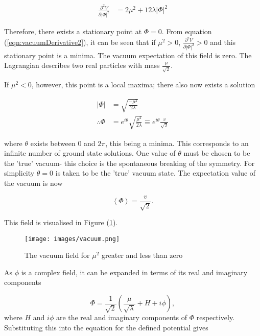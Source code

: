 \documentclass{article}
\begin{document}
\begin{equation}
\label{eqn:vacuumDerivative2}
\begin{split}
\frac{\partial^2 V}{\partial |\Phi|^2} & = 2\mu^2 + 12\lambda|\Phi|^2
\end{split}
\end{equation}

Therefore, there exists a stationary point at $\Phi = 0$. From equation (\ref{eqn:vacuumDerivative2}), it can be seen that if $\mu^2>0$, $\frac{\partial^2 V}{\partial |\Phi|^2}>0$ and this stationary point is a minima. The vacuum expectation of this field is zero. The Lagrangian describes two real particles with mass $\frac{\mu}{\sqrt{2}}$.

If $\mu^2<0$, however, this point is a local maxima; there also now exists a solution

\begin{equation}
\begin{split}
|\Phi| & = \sqrt{\frac{-\mu^2}{2\lambda}} \\
\therefore\Phi & = e^{i\theta}\sqrt{\frac{\mu^2}{2\lambda}}\equiv e^{i\theta}\frac{v}{\sqrt{2}}
\end{split}
\end{equation}

where $\theta$ exists between $0$ and $2\pi$, this being a minima. This corresponds to an infinite number of ground state solutions. One value of $\theta$ must be chosen to be the 'true' vacuum- this choice is the spontaneous breaking of the symmetry. For simplicity $\theta = 0$ is taken to be the 'true' vacuum state. The expectation value of the vacuum is now

\begin{equation}
\left< \Phi \right> = \frac{v}{\sqrt{2}}.
\end{equation}

This field is visualised in Figure (\ref{fig:vacuum}).

\begin{figure}
    \centering
    \label{fig:vacuum}
    \texttt{[image: images/vacuum.png]}
    \caption{The vacuum field for $\mu^2$ greater and less than zero}
\end{figure}


As $\phi$ is a complex field, it can be expanded in terms of its real and imaginary components 

\begin{equation}
\label{eqn:vevExpnd}
\Phi = \frac{1}{\sqrt{2}}\left( \frac{\mu}{\sqrt{\lambda}} + H + i\phi \right),
\end{equation}
where $H$ and $i\phi$ are the real and imaginary components of $\Phi$ respectively.
Substituting this into the equation for the defined potential gives
\end{document}
